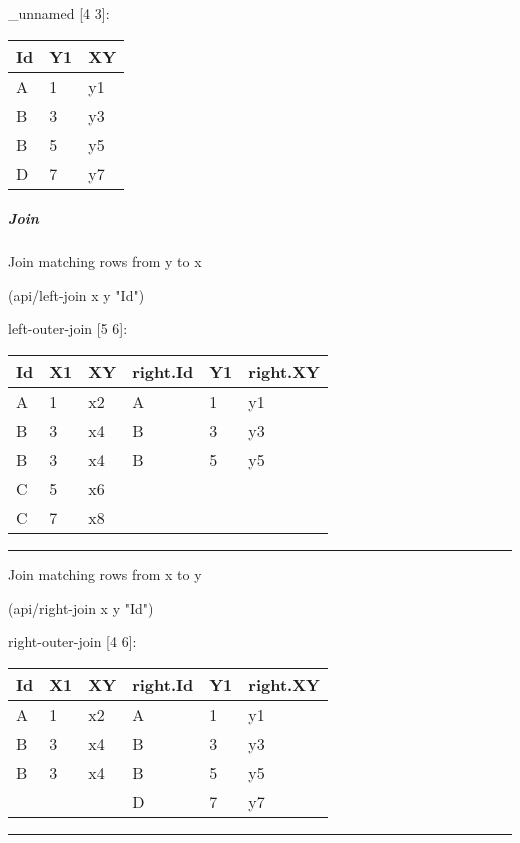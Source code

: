 \documentclass[]{article}
\newenvironment{Shaded}{\begin{snugshade}}{\end{snugshade}}
\newcommand{\NormalTok}[1]{#1}
\newcommand{\StringTok}[1]{\textcolor[rgb]{0.31,0.60,0.02}{#1}}
\let\oldsubparagraph\subparagraph
\renewcommand{\subparagraph}[1]{\oldsubparagraph{#1}\mbox{}}
\begin{document}
\_unnamed {[}4 3{]}:

\begin{longtable}[]{@{}lll@{}}
\toprule
Id & Y1 & XY\tabularnewline
\midrule
\endhead
A & 1 & y1\tabularnewline
B & 3 & y3\tabularnewline
B & 5 & y5\tabularnewline
D & 7 & y7\tabularnewline
\bottomrule
\end{longtable}

\hypertarget{join-1}{%
\subparagraph{Join}\label{join-1}}

Join matching rows from y to x

\begin{Shaded}
\begin{Highlighting}[]
\NormalTok{(api/left-join x y }\StringTok{"Id"}\NormalTok{)}
\end{Highlighting}
\end{Shaded}

left-outer-join {[}5 6{]}:

\begin{longtable}[]{@{}llllll@{}}
\toprule
Id & X1 & XY & right.Id & Y1 & right.XY\tabularnewline
\midrule
\endhead
A & 1 & x2 & A & 1 & y1\tabularnewline
B & 3 & x4 & B & 3 & y3\tabularnewline
B & 3 & x4 & B & 5 & y5\tabularnewline
C & 5 & x6 & & &\tabularnewline
C & 7 & x8 & & &\tabularnewline
\bottomrule
\end{longtable}

\begin{center}\rule{0.5\linewidth}{0.5pt}\end{center}

Join matching rows from x to y

\begin{Shaded}
\begin{Highlighting}[]
\NormalTok{(api/right-join x y }\StringTok{"Id"}\NormalTok{)}
\end{Highlighting}
\end{Shaded}

right-outer-join {[}4 6{]}:

\begin{longtable}[]{@{}llllll@{}}
\toprule
Id & X1 & XY & right.Id & Y1 & right.XY\tabularnewline
\midrule
\endhead
A & 1 & x2 & A & 1 & y1\tabularnewline
B & 3 & x4 & B & 3 & y3\tabularnewline
B & 3 & x4 & B & 5 & y5\tabularnewline
& & & D & 7 & y7\tabularnewline
\bottomrule
\end{longtable}

\begin{center}\rule{0.5\linewidth}{0.5pt}\end{center}
\end{document}
